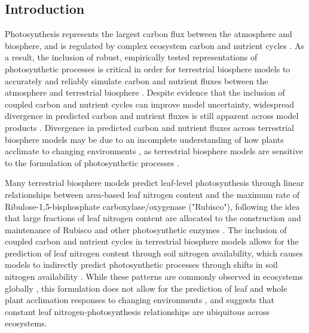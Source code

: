 \begin{singlespace}
    \chapter{\textbf{Introduction}}
\end{singlespace}

Photosynthesis represents the largest carbon flux between the atmosphere and biosphere, and is regulated by complex ecosystem carbon and nutrient cycles . As a result, the inclusion of robust, empirically tested representations of photosynthetic processes is critical in order for terrestrial biosphere models to accurately and reliably simulate carbon and nutrient fluxes between the atmosphere and terrestrial biosphere . Despite evidence that the inclusion of coupled carbon and nutrient cycles can improve model uncertainty, widespread divergence in predicted carbon and nutrient fluxes is still apparent across model products . Divergence in predicted carbon and nutrient fluxes across terrestrial biosphere models may be due to an incomplete understanding of how plants acclimate to changing environments , as terrestrial biosphere models are sensitive to the formulation of photosynthetic processes .

Many terrestrial biosphere models predict leaf-level photosynthesis through linear relationships between area-based leaf nitrogen content and the maximum rate of Ribulose-1,5-bisphosphate carboxylase/oxygenase ("Rubisco"), following the idea that large fractions of leaf nitrogen content are allocated to the construction and maintenance of Rubisco and other photosynthetic enzymes . The inclusion of coupled carbon and nutrient cycles in terrestrial biosphere models  allows for the prediction of leaf nitrogen content through soil nitrogen availability, which causes models to indirectly predict photosynthetic processes through shifts in soil nitrogen availability . While these patterns are commonly observed in ecosystems globally , this formulation does not allow for the prediction of leaf and whole plant acclimation responses to changing environments , and suggests that constant leaf nitrogen-photosynthesis relationships are ubiquitous across ecosystems. 

